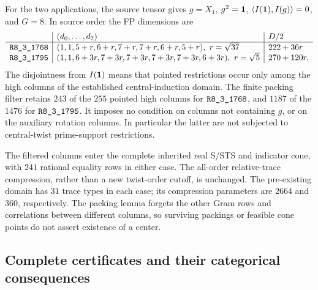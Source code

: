 For the two applications, the source tensor gives $g=X_1$, $g^2=\mathbf1$,
$\langle I(\mathbf1),I(g)\rangle=0$, and $G=8$.  In source order the
FP dimensions are
\[
\begin{array}{c|l|l}
 & (d_0,\ldots,d_7)&D/2\\\hline
\sha{R8_3_1768}
 &(1,1,5+r,6+r,7+r,7+r,6+r,5+r),\ r=\sqrt{37}
 &222+36r\\
\sha{R8_3_1795}
 &(1,1,6+3r,7+3r,7+3r,7+3r,7+3r,6+3r),\ r=\sqrt5
 &270+120r.
\end{array}
\]
The disjointness from $I(\mathbf1)$ means that pointed restrictions occur
only among the high columns of the established central-induction domain.
The finite packing filter retains $243$ of the $255$ pointed high
columns for $\sha{R8_3_1768}$, and $1187$ of the $1476$ for
$\sha{R8_3_1795}$.  It imposes no condition on columns not containing
$g$, or on the auxiliary rotation columns.  In particular the latter
are not subjected to central-twist prime-support restrictions.

The filtered columns enter the complete inherited real S/STS and
indicator cone, with $241$ rational equality rows in either case.
The all-order relative-trace compression, rather than a new twist-order
cutoff, is unchanged.  The pre-existing domain has $31$ trace types in
each case; its compression parameters are $2664$ and $360$, respectively.
The packing lemma forgets the other Gram rows and correlations between
different columns, so surviving packings or feasible cone points do not
assert existence of a center.

\subsection{Complete certificates and their categorical consequences}

